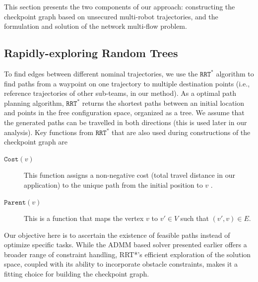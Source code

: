 \documentclass[10pt,twocolumn,twoside]{IEEEtran}
\newcommand{\rrtstar}{$\texttt{RRT}^\texttt{*}$}
\begin{document}

This section presents the two components of our approach: constructing the checkpoint graph based on unsecured multi-robot trajectories, and the formulation and solution of the network multi-flow problem.

\subsection{Rapidly-exploring Random Trees}
To find edges between different nominal trajectories, we use the \rrtstar{} \cite{karaman2010incremental} algorithm to find paths from a waypoint on one trajectory to multiple destination points (i.e., reference trajectories of other sub-teams, in our method). As a optimal path planning algorithm, \rrtstar{} returns the shortest paths between an initial location and points in the free configuration space, organized as a tree. We assume that the generated paths can be travelled in both directions (this is used later in our analysis). 
Key functions from \rrtstar{} that are also used during constructions of the checkpoint graph are
\begin{description}
\item[$\texttt{Cost}(v)$] This function assigns a non-negative cost (total travel distance in our application) to the unique path from the initial position to $v$ . 
\item[$\texttt{Parent}(v)$] This is a function that maps the vertex $v$ to $v'\in V$ such that $(v',v)\in E$.
\end{description}

Our objective here is to ascertain the existence of feasible paths instead of optimize specific tasks. While the ADMM based solver  presented earlier offers a broader range of constraint handling, RRT*'s efficient exploration of the solution space, coupled with its ability to incorporate obstacle constraints, makes it a fitting choice for building the checkpoint graph.
\end{document}
